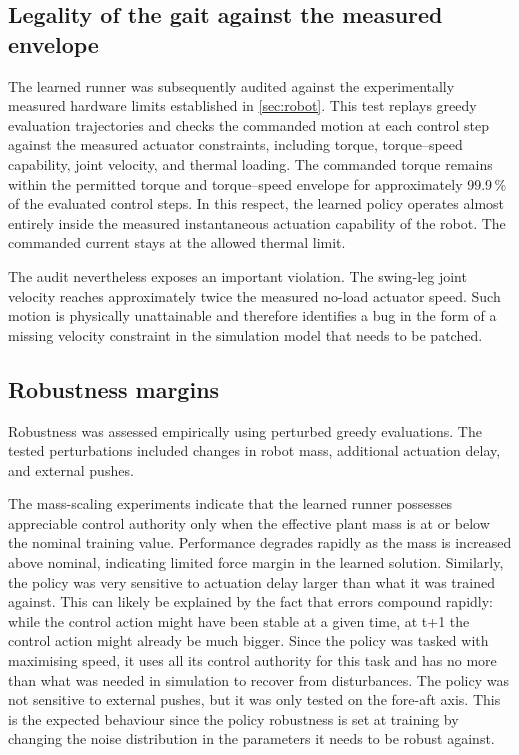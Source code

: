 \subsection{Legality of the gait against the measured envelope}

The learned runner was subsequently audited against the experimentally measured hardware limits established in \cref{sec:robot}.
This test replays greedy evaluation trajectories and checks the commanded motion at each control step against the measured actuator constraints, including torque, torque--speed capability, joint velocity, and thermal loading.
The commanded torque remains within the permitted torque and torque--speed envelope for approximately 99.9\,\% of the evaluated control steps.
In this respect, the learned policy operates almost entirely inside the measured instantaneous actuation capability of the robot.
The commanded current stays at the allowed thermal limit.

The audit nevertheless exposes an important violation.
The swing-leg joint velocity reaches approximately twice the measured no-load actuator speed.
Such motion is physically unattainable and therefore identifies a bug in the form of a missing velocity constraint in the simulation model that needs to be patched.

\subsection{Robustness margins}

Robustness was assessed empirically using perturbed greedy evaluations.
The tested perturbations included changes in robot mass, additional actuation delay, and external pushes.

The mass-scaling experiments indicate that the learned runner possesses appreciable control authority only when the effective plant mass is at or below the nominal training value.
Performance degrades rapidly as the mass is increased above nominal, indicating limited force margin in the learned solution.
Similarly, the policy was very sensitive to actuation delay larger than what it was trained against.
This can likely be explained by the fact that errors compound rapidly: while the control action might have been stable at a given time, at t+1 the control action might already be much bigger. Since the policy was tasked with maximising speed, it uses all its control authority for this task and has no more than what was needed in simulation to recover from disturbances.
The policy was not sensitive to external pushes, but it was only tested on the fore-aft axis.
This is the expected behaviour since the policy robustness is set at training by changing the noise distribution in the parameters it needs to be robust against.

